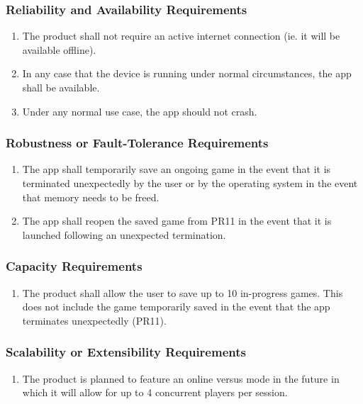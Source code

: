 \documentclass[]{article}
\begin{document}
\subsubsection{Reliability and Availability Requirements}
\label{ssub:reliability_and_availability_requirements}
\begin{enumerate}[{PR}1. ]
	\resumeEnum
	\item The product shall not require an active internet connection (ie. it will be available offline).
	\item In any case that the device is running under normal circumstances, the app shall be available.
	\item Under any normal use case, the app should not crash.
	\holdEnum
\end{enumerate}

\subsubsection{Robustness or Fault-Tolerance Requirements}
\label{ssub:robustness_or_fault_tolerance_requirements}
\begin{enumerate}[{PR}1. ]
	\resumeEnum
	\item The app shall temporarily save an ongoing game in the event that it is terminated unexpectedly by the user or by the operating system in the event that memory needs to be freed. 
	\item The app shall reopen the saved game from PR11 in the event that it is launched following an unexpected termination.
	\holdEnum
\end{enumerate}

\subsubsection{Capacity Requirements}
\label{ssub:capacity_requirements}
\begin{enumerate}[{PR}1. ]
	\resumeEnum
	\item The product shall allow the user to save up to 10 in-progress games. This does not include the game temporarily saved in the event that the app terminates unexpectedly (PR11).
	\holdEnum
\end{enumerate}

\subsubsection{Scalability or Extensibility Requirements}
\label{ssub:scalability_or_extensibility_requirements}
\begin{enumerate}[{PR}1. ]
	\resumeEnum
	\item The product is planned to feature an online versus mode in the future in which it will allow for up to 4 concurrent players per session. 
	\holdEnum
\end{enumerate}
\end{document}
